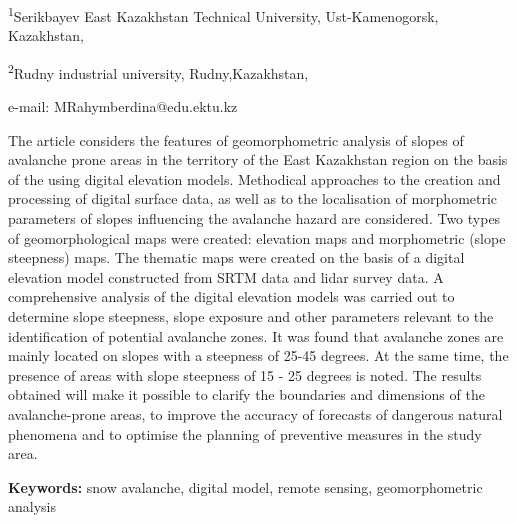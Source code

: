 \begin{affiliation}
\textsuperscript{1}Serikbayev East Kazakhstan Technical University, Ust-Kamenogorsk, Kazakhstan,

\textsuperscript{2}Rudny industrial university, Rudny,Kazakhstan,

e-mail: MRahymberdina@edu.ektu.kz
\end{affiliation}

The article considers the features of geomorphometric analysis of slopes
of avalanche prone areas in the territory of the East Kazakhstan region
on the basis of the using digital elevation models. Methodical
approaches to the creation and processing of digital surface data, as
well as to the localisation of morphometric parameters of slopes
influencing the avalanche hazard are considered. Two types of
geomorphological maps were created: elevation maps and morphometric
(slope steepness) maps. The thematic maps were created on the basis of a
digital elevation model constructed from SRTM data and lidar survey
data. A comprehensive analysis of the digital elevation models was
carried out to determine slope steepness, slope exposure and other
parameters relevant to the identification of potential avalanche zones.
It was found that avalanche zones are mainly located on slopes with a
steepness of 25-45 degrees. At the same time, the presence of areas with
slope steepness of 15 - 25 degrees is noted. The results obtained will
make it possible to clarify the boundaries and dimensions of the
avalanche-prone areas, to improve the accuracy of forecasts of dangerous
natural phenomena and to optimise the planning of preventive measures in
the study area.

{\bfseries Keywords:} snow avalanche, digital model, remote sensing,
geomorphometric analysis

